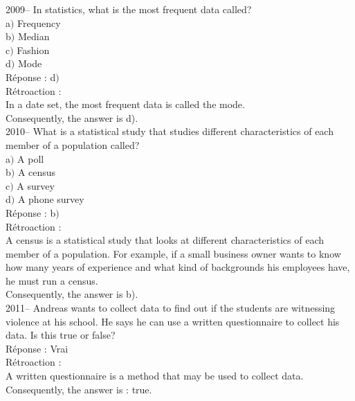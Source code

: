 \documentclass[letterpaper, 12pt]{article}
\begin{document}
2009-- In statistics, what is the most frequent data called?\\

a$)$ Frequency \\
b$)$ Median\\
c$)$ Fashion\\
d$)$ Mode\\

R\'eponse : d$)$\\

R\'etroaction :\\
In a date set, the most frequent data is called the mode.\\
Consequently, the answer is d).\\


2010-- What is a statistical study that studies different characteristics of each member of a population called? \\

a$)$ A poll\\
b$)$ A census\\
c$)$ A survey\\
d$)$ A phone survey\\

R\'eponse : b$)$\\

R\'etroaction :\\
A census is a statistical study that looks at different characteristics of each member of a population. For example, if a small business owner wants to know how many years of experience and what kind of backgrounds his employees have, he must run a census. \\
Consequently, the answer is b).\\

2011-- Andreas wants to collect data to find out if the students are witnessing violence at his school. He says he can use a written questionnaire to collect his data. Is this true or false?\\

R\'eponse : Vrai\\

R\'etroaction :\\
A written questionnaire is a method that may be used to collect data. \\
Consequently, the answer is : true.\\

\end{document}
